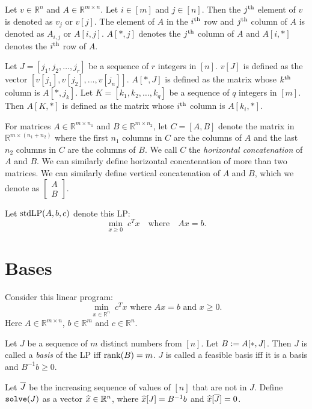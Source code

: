 \begin{inLongVersion}
Let $v \in \mathbb{R}^n$ and $A \in \mathbb{R}^{m \times n}$.
Let $i \in [m]$ and $j \in [n]$.
Then the $j^{\textrm{th}}$ element of $v$ is denoted as $v_j$ or $v[j]$.
The element of $A$ in the $i^{\textrm{th}}$ row and $j^{\textrm{th}}$ column of $A$ is denoted as
$A_{i,j}$ or $A[i,j]$. $A[*,j]$ denotes the $j^{\textrm{th}}$ column of $A$ and
$A[i, *]$ denotes the $i^{\textrm{th}}$ row of $A$.

Let $J = [j_1, j_2, \ldots, j_r]$ be a sequence of $r$ integers in $[n]$.
$v[J]$ is defined as the vector $[v[j_1], v[j_2], \ldots, v[j_n]]$.
$A[*,J]$ is defined as the matrix whose $k^{\textrm{th}}$ column is $A[*,j_k]$.
Let $K = [k_1, k_2, \ldots, k_q]$ be a sequence of $q$ integers in $[m]$.
Then $A[K,*]$ is defined as the matrix whose $i^{\textrm{th}}$ column is $A[k_i,*]$.

For matrices $A \in \mathbb{R}^{m \times n_1}$ and $B \in \mathbb{R}^{m \times n_2}$,
let $C = [A, B]$ denote the matrix in $\mathbb{R}^{m \times (n_1 + n_2)}$
where the first $n_1$ columns in $C$ are the columns of $A$
and the last $n_2$ columns in $C$ are the columns of $B$.
We call $C$ the \emph{horizontal concatenation} of $A$ and $B$.
We can similarly define horizontal concatenation of more than two matrices.
We can similarly define vertical concatenation of $A$ and $B$,
which we denote as $\begin{bmatrix}A\\B\end{bmatrix}$.
\end{inLongVersion}

\begin{definition}
Let $\operatorname{stdLP}(A, b, c)$ denote this LP:
\[ \min_{x \ge 0}\; c^Tx \quad\textrm{where}\quad Ax = b. \]
\end{definition}

\section{Bases}

Consider this linear program:
\[ \min_{x \in \mathbb{R}^n}\; c^Tx \textrm{ where } Ax = b \textrm{ and } x \ge 0. \]
Here $A \in \mathbb{R}^{m \times n}$, $b \in \mathbb{R}^m$ and $c \in \mathbb{R}^n$.

\begin{definition}[Basis]
Let $J$ be a sequence of $m$ distinct numbers from $[n]$.
Let $B := A[*,J]$.
Then $J$ is called a \emph{basis} of the LP iff $\operatorname{rank}(B) = m$.
$J$ is called a feasible basis iff it is a basis and $B^{-1}b \ge 0$.

Let $\overline{J}$ be the increasing sequence of values of $[n]$ that are not in $J$.
Define $\operatorname{\mathtt{solve}}(J)$ as a vector $\widehat{x} \in \mathbb{R}^n$,
where $\widehat{x}[J] = B^{-1}b$ and $\widehat{x}[\overline{J}] = 0$.
\end{definition}

